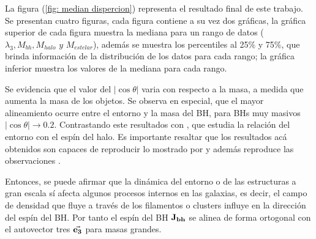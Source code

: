 La figura (\ref{fig: median dispercion}) representa el resultado final de este trabajo. Se presentan cuatro  figuras, cada figura contiene a su vez dos gráficas, la gráfica superior de cada figura muestra la mediana para un rango de datos ($\lambda_{3}, M_{bh}, M_{halo}\,\, y\,\, M_{estelar}$), además se muestra los percentiles al 25$\%$ y 75$\%$, que brinda información de la distribución de los datos para cada rango; la gráfica inferior muestra los valores de la  mediana para cada rango.

Se evidencia que el valor del $|\cos \theta|$ varia con respecto a la masa, a medida que aumenta la masa de los objetos.
Se observa en especial, que el mayor alineamiento ocurre entre el entorno y la masa del BH, para BHs muy masivos $|\cos\theta| \to 0.2$. Contrastando este resultados con \cite{wang2018}, que estudia la relación del entorno con el espín del halo. Es importante resaltar que los resultados acá obtenidos son capaces de reproducir lo mostrado por \cite{wang2018} y además reproduce las observaciones \cite{hutsemekers2014}.

Entonces, se puede afirmar que la dinámica del entorno o de las  estructuras a gran escala sí afecta algunos procesos internos en las galaxias, es decir, el campo de densidad que fluye a través de los filamentos o clusters influye en la dirección del espín del BH. Por tanto el espín del BH ${\bf{J_{bh}}}$ se alinea de forma ortogonal con el autovector tres $\vec{\bf{e}_3}$ para masas grandes. 
%

